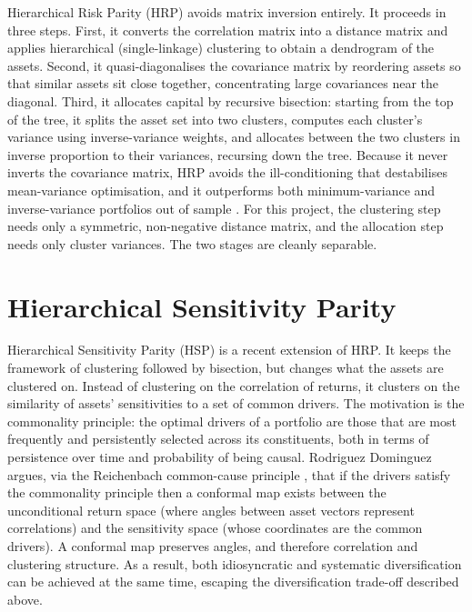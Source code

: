 \documentclass[12pt, a4paper]{report}
\begin{document}
Hierarchical Risk Parity (HRP) \cite{lopezdeprado2016hrp} avoids matrix
inversion entirely. It proceeds in three steps. First, it converts the correlation matrix into a
distance matrix and applies hierarchical (single-linkage) clustering to obtain a dendrogram of the
assets. Second, it quasi-diagonalises the covariance matrix by reordering assets so that
similar assets sit close together, concentrating large covariances near the diagonal. Third, it
allocates capital by recursive bisection: starting from the top of the tree, it splits the
asset set into two clusters, computes each cluster's variance using inverse-variance weights, and
allocates between the two clusters in inverse proportion to their variances, recursing down the
tree. Because it never inverts the covariance matrix, HRP avoids the ill-conditioning that
destabilises mean-variance optimisation, and it outperforms both minimum-variance and
inverse-variance portfolios out of sample \cite{lopezdeprado2016hrp}. For this project,
the clustering step needs only a symmetric, non-negative distance matrix, and the allocation step
needs only cluster variances. The two stages are cleanly separable.

\section{Hierarchical Sensitivity Parity}
\label{sec:hsp}

Hierarchical Sensitivity Parity (HSP) \cite{rodriguez2023hsp} is a recent extension of HRP.
It keeps the framework of clustering followed by bisection, but changes what the assets are clustered on. Instead of clustering on the
correlation of returns, it clusters on the similarity of assets' sensitivities to a set of
common drivers. The motivation is the commonality principle: the optimal drivers of a
portfolio are those that are most frequently and persistently selected across its constituents, both in
terms of persistence over time and probability of being causal. Rodriguez Dominguez
\cite{rodriguez2023hsp,rodriguez2025causal} argues, via the Reichenbach common-cause principle
\cite{hitchcock2020reichenbach}, that if the drivers satisfy the commonality principle then a
conformal map exists between the unconditional return space (where angles between asset vectors
represent correlations) and the sensitivity space (whose coordinates are the common drivers). A
conformal map preserves angles, and therefore correlation and clustering structure. 
As a result, both idiosyncratic
and systematic diversification can be achieved at the same time, escaping the diversification
trade-off described above.
\end{document}
